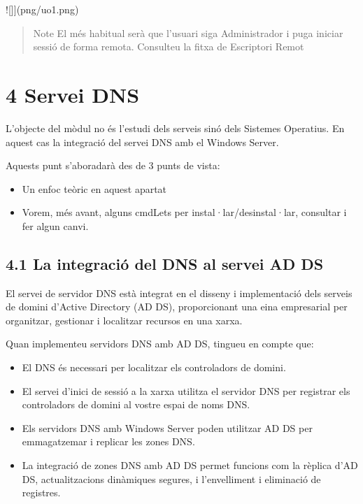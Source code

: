 \documentclass[
  a4paper,
]{article}
\providecommand{\tightlist}{%
  \setlength{\itemsep}{0pt}\setlength{\parskip}{0pt}}
\begin{document}
!{[}{]}{]}(png/uo1.png)

\begin{quote}
Note El més habitual serà que l'usuari siga Administrador i puga iniciar
sessió de forma remota. Consulteu la fitxa de Escriptori Remot
\end{quote}

\section{4 Servei DNS}\label{servei-dns}

L'objecte del mòdul no és l'estudi dels serveis sinó dels Sistemes
Operatius. En aquest cas la integració del servei DNS amb el Windows
Server.

Aquests punt s'aboradarà des de 3 punts de vista:

\begin{itemize}
\tightlist
\item
  Un enfoc teòric en aquest apartat
\item
  Vorem, més avant, alguns cmdLets per instal·lar/desinstal·lar,
  consultar i fer algun canvi.
\end{itemize}

\subsection{4.1 La integració del DNS al servei AD
DS}\label{la-integraciuxf3-del-dns-al-servei-ad-ds}

El servei de servidor DNS està integrat en el disseny i implementació
dels serveis de domini d'Active Directory (AD DS), proporcionant una
eina empresarial per organitzar, gestionar i localitzar recursos en una
xarxa.

Quan implementeu servidors DNS amb AD DS, tingueu en compte que:

\begin{itemize}
\tightlist
\item
  El DNS és necessari per localitzar els controladors de domini.
\item
  El servei d'inici de sessió a la xarxa utilitza el servidor DNS per
  registrar els controladors de domini al vostre espai de noms DNS.
\item
  Els servidors DNS amb Windows Server poden utilitzar AD DS per
  emmagatzemar i replicar les zones DNS.
\item
  La integració de zones DNS amb AD DS permet funcions com la rèplica
  d'AD DS, actualitzacions dinàmiques segures, i l'envelliment i
  eliminació de registres.
\end{itemize}
\end{document}
